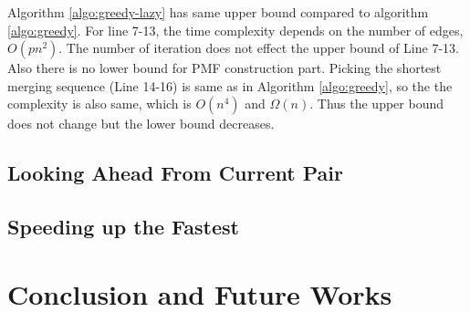 \documentclass[12pt]{article}
\newcommand{\comment}[2]{{\color{red}{\bf (#1: #2)}}}
\begin{document}
Algorithm \ref{algo:greedy-lazy} has same upper bound compared to algorithm \ref{algo:greedy}. For line 7-13, the time complexity depends on the number of edges, $O(pn^2)$. The number of iteration does not effect the upper bound of Line 7-13. Also there is no lower bound for PMF construction part. Picking the shortest merging sequence (Line 14-16) is same as in Algorithm \ref{algo:greedy}, so the the complexity is also same, which is $O(n^4)$ and $\Omega(n)$. Thus the upper bound does not change but the lower bound decreases.

\subsection{Looking Ahead From Current Pair}
\label{sec:lookahead}



\subsection{Speeding up the Fastest}
\label{sec:smart}

\clearpage
\section{Conclusion and Future Works}
\label{sec:conclusion}

\comment{sertac}{speeding up the fastest lookahead implementation'da he- sapladigimiz merging sequencelari kaydetmiyoruz. onlari kaydederek giden bir algoritma daha hizli olabilir belki.}

\comment{sertac}{algoritmalar icin web interface}

\clearpage


\end{document}
